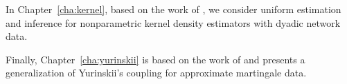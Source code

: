 In Chapter~\ref{cha:kernel},
based on the work of \cite{cattaneo2024uniform},
we consider uniform estimation and inference
for nonparametric kernel density estimators with dyadic
network data.

Finally, Chapter~\ref{cha:yurinskii}
is based on the work of
\cite{cattaneo2022yurinskii}
and presents a generalization of Yurinskii's coupling
for approximate martingale data.
